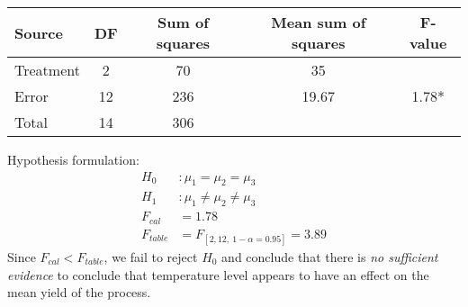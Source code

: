 \documentclass[12pt,a4paper, fleq]{article}
\begin{document}
\begin{tabular}{lcccc}
\toprule
Source	&	DF	&	Sum of squares	&	 Mean sum of squares	&	 F-value \\
\midrule
Treatment 	&	2	&	70			&		35\\
Error 		&	12	&	236			&		19.67			&	1.78*\\
Total		&	14	&	306			&	\\
\bottomrule
\end{tabular}

Hypothesis formulation:
\[
\begin{split}
H_0 &: \mu_1 = \mu_2 = \mu_3\\
H_1 &: \mu_1 \neq \mu_2 \neq \mu_3\\[5mm]
F_{cal} &= 1.78\\
F_{table} &= F_{[2, 12, \:1-\alpha = 0.95]} = 3.89
\end{split}
\]
Since $F_{cal} < F_{table}$, we fail to reject $H_0$ and conclude that there is {\it no sufficient evidence} to conclude that temperature level appears to have an effect on the mean yield of the process.

\end{document}
